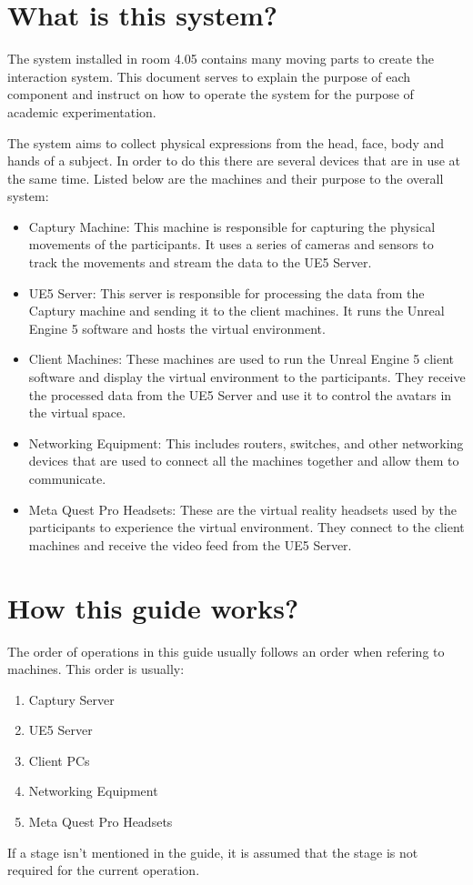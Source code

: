 \section{What is this system?}
The system installed in room 4.05 contains many moving parts to create the interaction system. This document serves to explain the purpose of each component and instruct on how to operate the system for the purpose of academic experimentation.

The system aims to collect physical expressions from the head, face, body and hands of a subject. In order to do this there are several devices that are in use at the same time. Listed below are the machines and their purpose to the overall system:

\begin{itemize}
    \item Captury Machine: This machine is responsible for capturing the physical movements of the participants. It uses a series of cameras and sensors to track the movements and stream the data to the UE5 Server.
    \item UE5 Server: This server is responsible for processing the data from the Captury machine and sending it to the client machines. It runs the Unreal Engine 5 software and hosts the virtual environment.
    \item Client Machines: These machines are used to run the Unreal Engine 5 client software and display the virtual environment to the participants. They receive the processed data from the UE5 Server and use it to control the avatars in the virtual space.
    \item Networking Equipment: This includes routers, switches, and other networking devices that are used to connect all the machines together and allow them to communicate.
    \item Meta Quest Pro Headsets: These are the virtual reality headsets used by the participants to experience the virtual environment. They connect to the client machines and receive the video feed from the UE5 Server.
\end{itemize}

\section{How this guide works?}
The order of operations in this guide usually follows an order when refering to machines. This order is usually:
\begin{enumerate}
    \item Captury Server
    \item UE5 Server
    \item Client PCs
    \item Networking Equipment
    \item Meta Quest Pro Headsets
\end{enumerate}
If a stage isn't mentioned in the guide, it is assumed that the stage is not required for the current operation.